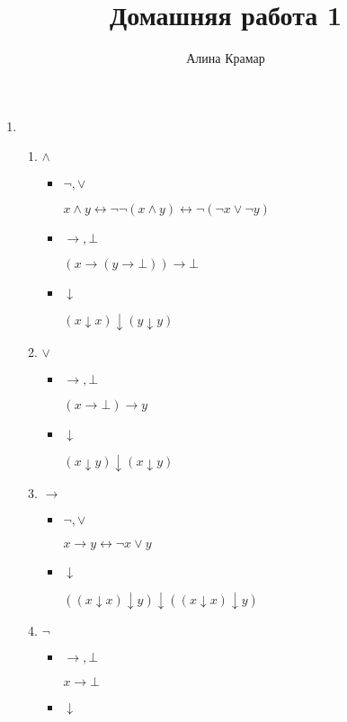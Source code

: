 \documentclass{article}
\begin{document}
\title{Домашняя работа 1}
\author{Алина Крамар}

\maketitle
\begin{enumerate}

\item
  \begin{enumerate}
    \item $\land$
      \begin{itemize}
      \item $\neg , \lor $

        $x \land y \leftrightarrow \neg \neg (x \land y) \leftrightarrow \neg
        (\neg x \lor \neg y)$
      \item $\to , \bot $

        $(x \to (y \to \bot)) \to \bot $
      \item $\downarrow$

        $(x \downarrow x) \downarrow (y \downarrow y)$
      \end{itemize}

    \item $\lor$
      \begin{itemize}
      \item $\to , \bot $

        $(x \to \bot) \to y$
      \item $\downarrow$

        $(x \downarrow y) \downarrow (x \downarrow y)$
      \end{itemize}

    \item $\to$
      \begin{itemize}
      \item $\neg , \lor$

        $x \to y \leftrightarrow \neg x \lor y$
      \item $\downarrow$

        $((x \downarrow x) \downarrow y) \downarrow ((x \downarrow x) \downarrow y)$
      \end{itemize}

    \item $\neg$
      \begin{itemize}
      \item $\to , \bot $

        $x \to \bot$
      \item $\downarrow$


\end{itemize}
\end{enumerate}
\end{enumerate}
\end{document}
